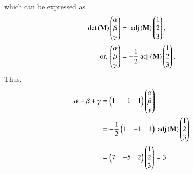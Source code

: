 \documentclass[journal,12pt,twocolumn]{IEEEtran}
\renewcommand\thesection{\arabic{section}}
\begin{document}
\begin{enumerate}[label=\thesection.\arabic*
,ref=\thesection.\theenumi]
\begin{align}
\end{align}
%
which can be expressed as
\begin{align}
 \det\left(\mathbf{M}\right)\begin{pmatrix}\alpha \\ \beta \\ \gamma\end{pmatrix}  &= \text{ adj}\left(\mathbf{M}\right)\begin{pmatrix}1 \\ 2 \\ 3\end{pmatrix}, 
\\
\text{or, } \begin{pmatrix}\alpha \\ \beta \\ \gamma\end{pmatrix} &= -\frac{1}{2}\text{ adj}\left(\mathbf{M}\right)\begin{pmatrix}1 \\ 2 \\ 3\end{pmatrix}, 
\end{align}
Thus, 
\begin{align}
\alpha - \beta + \gamma &= \begin{pmatrix}1 & -1& 1\end{pmatrix} \begin{pmatrix}\alpha \\ \beta \\ \gamma\end{pmatrix} 
\\
&=-\frac{1}{2}\begin{pmatrix}1 & -1& 1\end{pmatrix}\text{ adj}\left(\mathbf{M}\right)\begin{pmatrix}1 \\ 2 \\ 3\end{pmatrix}
\\
&=\begin{pmatrix}7 & -5& 2\end{pmatrix}\begin{pmatrix}1 \\ 2 \\ 3\end{pmatrix}
=3
\end{align}
\end{enumerate}
\end{document}
